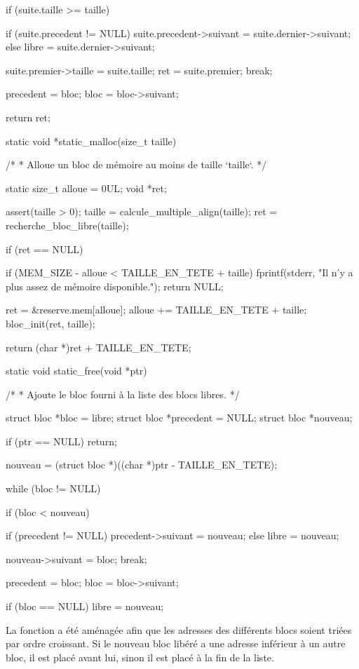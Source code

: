 \begin{C}
{{        if (suite.taille >= taille)
        {
            if (suite.precedent != NULL)
                suite.precedent->suivant = suite.dernier->suivant;
            else
                libre = suite.dernier->suivant;

            suite.premier->taille = suite.taille;
            ret = suite.premier;
            break;
        }

        precedent = bloc;
        bloc = bloc->suivant;
    }

    return ret;
}


static void *static_malloc(size_t taille)
{
    /*
     * Alloue un bloc de mémoire au moins de taille `taille`.
     */

    static size_t alloue = 0UL;
    void *ret;

    assert(taille > 0);
    taille = calcule_multiple_align(taille);
    ret = recherche_bloc_libre(taille);

    if (ret == NULL)
    {
        if (MEM_SIZE - alloue < TAILLE_EN_TETE + taille)
        {
            fprintf(stderr, "Il n'y a plus assez de mémoire disponible.\n");
            return NULL;
        }

        ret = &reserve.mem[alloue];
        alloue += TAILLE_EN_TETE + taille;
        bloc_init(ret, taille);
    }

    return (char *)ret + TAILLE_EN_TETE;
}


static void static_free(void *ptr)
{
    /*
     * Ajoute le bloc fourni à la liste des blocs libres.
     */

    struct bloc *bloc = libre;
    struct bloc *precedent = NULL;
    struct bloc *nouveau;

    if (ptr == NULL)
         return;

    nouveau = (struct bloc *)((char *)ptr - TAILLE_EN_TETE);

    while (bloc != NULL)
    {
        if (bloc < nouveau)
        {
            if (precedent != NULL)
                precedent->suivant = nouveau;
            else
                libre = nouveau;
                

            nouveau->suivant = bloc;
            break;
        }

        precedent = bloc;
        bloc = bloc->suivant;
    }

    if (bloc == NULL)
        libre = nouveau;
}
\end{C}

La fonction  a été aménagée afin que les adresses
des différents blocs soient triées par ordre croissant. Si le nouveau
bloc libéré a une adresse inférieur à un autre bloc, il est placé avant
lui, sinon il est placé à la fin de la liste.

